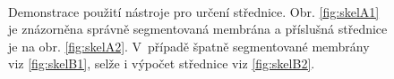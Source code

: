 \begin{figure}[htb]
	\centering
	\hskip 0.1cm
	\\
	\hskip 0.1cm
	\caption{Demonstrace použití nástroje pro určení střednice. Obr. \ref{fig:skelA1} je znázorněna správně segmentovaná membrána a příslušná střednice je na obr. \ref{fig:skelA2}. V~případě špatně segmentované membrány viz \ref{fig:skelB1}, selže i výpočet střednice viz \ref{fig:skelB2}.}
	\label{fig:skel}
\end{figure}

